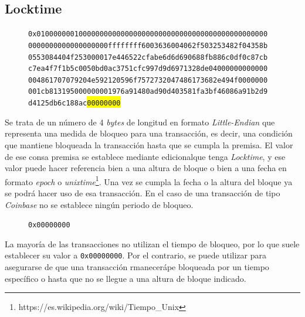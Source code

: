 \documentclass{article}
\begin{document}
    \subsection{Locktime}
    
    \begin{figure}[H]
        \texttt{0x0100000001000000000000000000000000000000000000000000000} \\
        \texttt{0000000000000000000ffffffff6003636004062f503253482f04358b} \\
        \texttt{0553084404f253000017e446522cfabe6d6d690688fb886c0df0c87cb} \\
        \texttt{c7ea4f7f1b5c0050bd0ac3751cfc997d9d6971328de04000000000000} \\
        \texttt{004861707079204e592120596f7572732047486173682e494f0000000} \\
        \texttt{001cb813195000000001976a91480ad90d403581fa3bf46086a91b2d9} \\
        \texttt{d4125db6c188ac\colorbox{Yellow}{00000000}}
    \end{figure}
    
    Se trata de un número de 4 \textit{bytes} de longitud en formato \textit{Little-Endian} que representa una medida de bloqueo para una transacción, es decir, una condición que mantiene bloqueada la transacción hasta que se cumpla la premisa. El valor  de ese consa premisa se establece mediante edicionalque tenga \textit{Locktime}, y ese valor puede hacer referencia bien a una altura de bloque o bien a una fecha en formato \textit{epoch} o \textit{unixtime}\footnote{https://es.wikipedia.org/wiki/Tiempo\_Unix}. Una vez se cumpla la fecha o la altura del bloque ya se podrá hacer uso de esa transacción. En el caso de una transacción de tipo \textit{Coinbase} no se establece ningún periodo de bloqueo.
    \begin{figure}[H]
        \texttt{0x00000000}
    \end{figure}
    
    La mayoría de las transacciones no utilizan el tiempo de bloqueo, por lo que suele establecer su valor a \texttt{0x00000000}. Por el contrario, se puede utilizar para asegurarse de que una transacción rmanecerápe bloqueada por un tiempo específico o hasta que no se llegue a una altura de bloque indicado.
    
\end{document}
